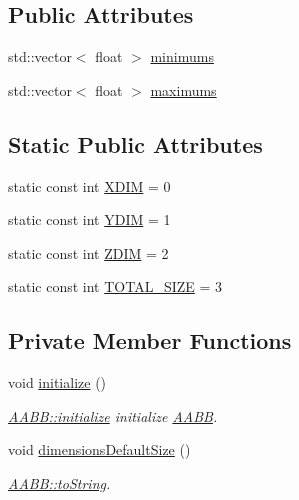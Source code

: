 \subsection*{Public Attributes}
\begin{DoxyCompactItemize}
\item 
std\+::vector$<$ float $>$ \hyperlink{class_a_a_b_b_aaf1ec35e5c0258cd57e65429f93c14a2}{minimums}
\item 
std\+::vector$<$ float $>$ \hyperlink{class_a_a_b_b_a1289c3a2e5c7a98f90d5bcdb8251a06f}{maximums}
\end{DoxyCompactItemize}
\subsection*{Static Public Attributes}
\begin{DoxyCompactItemize}
\item 
static const int \hyperlink{class_a_a_b_b_aac753e0248d039329b25b38d0ed9cd4f}{X\+D\+IM} = 0
\item 
static const int \hyperlink{class_a_a_b_b_a5192e3bdf0789cdc9e5f643b401e5b10}{Y\+D\+IM} = 1
\item 
static const int \hyperlink{class_a_a_b_b_a3e78cd8baa6ab6199afb2cb014e0db62}{Z\+D\+IM} = 2
\item 
static const int \hyperlink{class_a_a_b_b_a7ec2385af789441375335c09cff0709c}{T\+O\+T\+A\+L\+\_\+\+S\+I\+ZE} = 3
\end{DoxyCompactItemize}
\subsection*{Private Member Functions}
\begin{DoxyCompactItemize}
\item 
void \hyperlink{class_a_a_b_b_aa2a1a47dc45291be16276dd397bc78fe}{initialize} ()
\begin{DoxyCompactList}\small\item\em \hyperlink{class_a_a_b_b_aa2a1a47dc45291be16276dd397bc78fe}{A\+A\+B\+B\+::initialize} initialize \hyperlink{class_a_a_b_b}{A\+A\+BB}. \end{DoxyCompactList}\item 
void \hyperlink{class_a_a_b_b_a7b7d51fd225c32d5a4d2723b1d9e503b}{dimensions\+Default\+Size} ()
\begin{DoxyCompactList}\small\item\em \hyperlink{class_a_a_b_b_af66da47bd15d679936e05af231b45b75}{A\+A\+B\+B\+::to\+String}. \end{DoxyCompactList}\end{DoxyCompactItemize}


